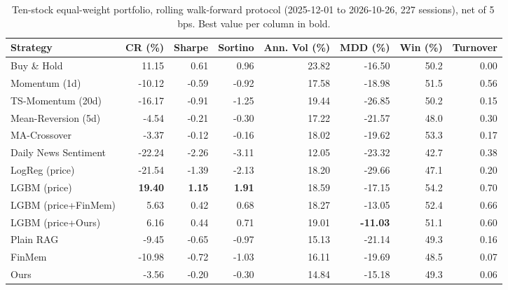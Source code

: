 \begin{table}[ht]
\centering
\caption{Ten-stock equal-weight portfolio, rolling walk-forward protocol (2025-12-01 to 2026-10-26, 227 sessions), net of 5\,bps. Best value per column in bold.}
\label{tab:main}
\small
\begin{tabular}{lrrrrrrr}
\hline
Strategy & CR (\%) & Sharpe & Sortino & Ann. Vol (\%) & MDD (\%) & Win (\%) & Turnover \\
\hline
Buy \& Hold & 11.15 & 0.61 & 0.96 & 23.82 & -16.50 & 50.2 & 0.00 \\
Momentum (1d) & -10.12 & -0.59 & -0.92 & 17.58 & -18.98 & 51.5 & 0.56 \\
TS-Momentum (20d) & -16.17 & -0.91 & -1.25 & 19.44 & -26.85 & 50.2 & 0.15 \\
Mean-Reversion (5d) & -4.54 & -0.21 & -0.30 & 17.22 & -21.57 & 48.0 & 0.30 \\
MA-Crossover & -3.37 & -0.12 & -0.16 & 18.02 & -19.62 & 53.3 & 0.17 \\
Daily News Sentiment & -22.24 & -2.26 & -3.11 & 12.05 & -23.32 & 42.7 & 0.38 \\ \hline
LogReg (price) & -21.54 & -1.39 & -2.13 & 18.20 & -29.66 & 47.1 & 0.20 \\
LGBM (price) & \textbf{19.40} & \textbf{1.15} & \textbf{1.91} & 18.59 & -17.15 & 54.2 & 0.70 \\
LGBM (price+FinMem) & 5.63 & 0.42 & 0.68 & 18.27 & -13.05 & 52.4 & 0.66 \\
LGBM (price+Ours) & 6.16 & 0.44 & 0.71 & 19.01 & \textbf{-11.03} & 51.1 & 0.60 \\ \hline
Plain RAG & -9.45 & -0.65 & -0.97 & 15.13 & -21.14 & 49.3 & 0.16 \\
FinMem & -10.98 & -0.72 & -1.03 & 16.11 & -19.69 & 48.5 & 0.07 \\
Ours & -3.56 & -0.20 & -0.30 & 14.84 & -15.18 & 49.3 & 0.06 \\
\hline
\end{tabular}
\end{table}
